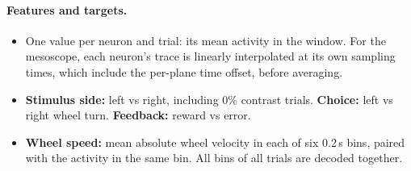 \documentclass[10pt]{article}
\begin{document}
\paragraph{Features and targets.}
\begin{itemize}
  \item One value per neuron and trial: its mean activity in the window. For the mesoscope, each neuron's trace is linearly interpolated at its own sampling times, which include the per-plane time offset, before averaging.
  \item \textbf{Stimulus side:} left vs right, including 0\% contrast trials. \textbf{Choice:} left vs right wheel turn. \textbf{Feedback:} reward vs error.
  \item \textbf{Wheel speed:} mean absolute wheel velocity in each of six 0.2\,s bins, paired with the activity in the same bin. All bins of all trials are decoded together.
\end{itemize}
\end{document}
